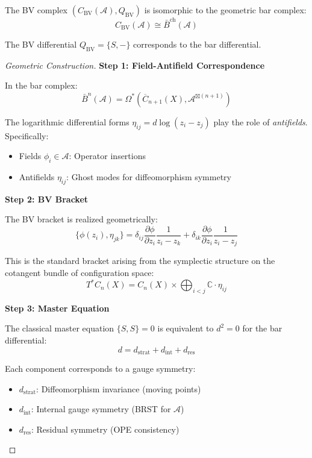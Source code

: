 \begin{theorem}[BV Complex = Geometric Bar Complex]
The BV complex $(C_{\text{BV}}(\mathcal{A}), Q_{\text{BV}})$ is isomorphic to 
the geometric bar complex:
$$C_{\text{BV}}(\mathcal{A}) \cong \bar{B}^{\text{ch}}(\mathcal{A})$$

The BV differential $Q_{\text{BV}} = \{S, -\}$ corresponds to the bar differential.
\end{theorem}

\begin{proof}[Geometric Construction]
\textbf{Step 1: Field-Antifield Correspondence}

In the bar complex:
$$\bar{B}^n(\mathcal{A}) = \Omega^*(\overline{C}_{n+1}(X), \mathcal{A}^{\boxtimes (n+1)})$$

The logarithmic differential forms $\eta_{ij} = d\log(z_i - z_j)$ play the role of 
\emph{antifields}. Specifically:
\begin{itemize}
\item Fields $\phi_i \in \mathcal{A}$: Operator insertions
\item Antifields $\eta_{ij}$: Ghost modes for diffeomorphism symmetry
\end{itemize}

\textbf{Step 2: BV Bracket}

The BV bracket is realized geometrically:
$$\{\phi(z_i), \eta_{jk}\} = \delta_{ij} \frac{\partial \phi}{\partial z_i} 
\frac{1}{z_i - z_k} + \delta_{ik} \frac{\partial \phi}{\partial z_i} 
\frac{1}{z_i - z_j}$$

This is the standard bracket arising from the symplectic structure on the 
cotangent bundle of configuration space:
$$T^*C_n(X) = C_n(X) \times \bigoplus_{i<j} \mathbb{C} \cdot \eta_{ij}$$

\textbf{Step 3: Master Equation}

The classical master equation $\{S, S\} = 0$ is equivalent to $d^2 = 0$ for the 
bar differential:
$$d = d_{\text{strat}} + d_{\text{int}} + d_{\text{res}}$$

Each component corresponds to a gauge symmetry:
\begin{itemize}
\item $d_{\text{strat}}$: Diffeomorphism invariance (moving points)
\item $d_{\text{int}}$: Internal gauge symmetry (BRST for $\mathcal{A}$)
\item $d_{\text{res}}$: Residual symmetry (OPE consistency)
\end{itemize}
\end{proof}

